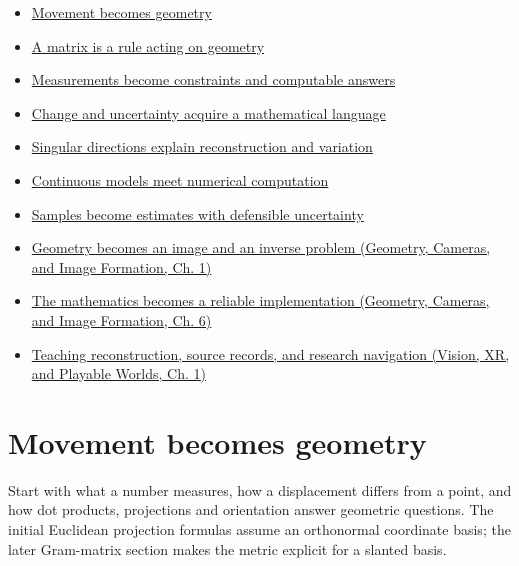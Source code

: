 \begin{itemize}
\tightlist
\item
  \hyperref[01-foundations-i-ch017-movement-becomes-geometry]{Movement becomes geometry}
\item
  \hyperref[01-foundations-i-ch018-a-matrix-is-a-rule-acting-on-geometry]{A matrix is a rule acting on geometry}
\item
  \hyperref[01-foundations-i-ch019-measurements-become-constraints-and-computable-answers]{Measurements become constraints and computable answers}
\item
  \hyperref[01-foundations-i-ch020-change-and-uncertainty-acquire-a-mathematical-language]{Change and uncertainty acquire a mathematical language}
\item
  \hyperref[02-foundations-ii-ch024-singular-directions-explain-reconstruction-and-variation]{Singular directions explain reconstruction and variation}
\item
  \hyperref[02-foundations-ii-ch025-continuous-models-meet-numerical-computation]{Continuous models meet numerical computation}
\item
  \hyperref[02-foundations-ii-ch029-samples-become-estimates-with-defensible-uncertainty]{Samples become estimates with defensible uncertainty}
\item
  \href{../03-Geometry-Cameras-and-Image-Formation/main.pdf\#nameddest=02-foundations-ii-ch032-geometry-becomes-an-image-and-an-inverse-problem-1}{Geometry becomes an image and an inverse problem (Geometry, Cameras, and Image Formation, Ch. 1)}
\item
  \href{../03-Geometry-Cameras-and-Image-Formation/main.pdf\#nameddest=02-foundations-ii-ch037-the-mathematics-becomes-a-reliable-implementation}{The mathematics becomes a reliable implementation (Geometry, Cameras, and Image Formation, Ch. 6)}
\item
  \href{../07-Vision-XR-and-Playable-Worlds/main.pdf\#nameddest=02-foundations-ii-ch039-teaching-reconstruction-source-records-and-research-navigation}{Teaching reconstruction, source records, and research navigation (Vision, XR, and Playable Worlds, Ch. 1)}
\end{itemize}

\section{Movement becomes geometry}\label{01-foundations-i-ch017-movement-becomes-geometry}

Start with what a number measures, how a displacement differs from a point, and how dot products, projections and orientation answer geometric questions. The initial Euclidean projection formulas assume an orthonormal coordinate basis; the later Gram-matrix section makes the metric explicit for a slanted basis.

